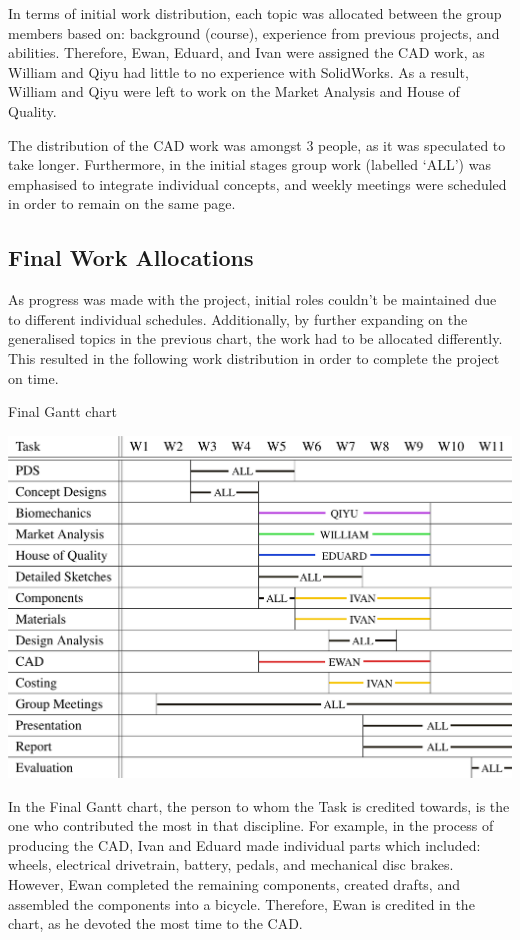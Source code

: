 \documentclass[a4paper,11pt]{article}
\begin{document}
In terms of initial work distribution, each topic was allocated between the group members based on: background (course), experience from previous projects, and abilities. Therefore, Ewan, Eduard, and Ivan were assigned the CAD work, as William and Qiyu had little to no experience with SolidWorks. As a result, William and Qiyu were left to work on the Market Analysis and House of Quality.

The distribution of the CAD work was amongst 3 people, as it was speculated to take longer. Furthermore, in the initial stages group work (labelled `ALL') was emphasised to integrate individual concepts, and weekly meetings were scheduled in order to remain on the same page.

\subsection{Final Work Allocations}

As progress was made with the project, initial roles couldn't be maintained due to different individual schedules. Additionally, by further expanding on the generalised topics in the previous chart, the work had to be allocated differently. This resulted in the following work distribution in order to complete the project on time.

\begin{table}[!ht]
	\centering
	\caption{Final Gantt chart}
	\includegraphics[width=1\textwidth]{gtf}
\end{table}

In the Final Gantt chart, the person to whom the Task is credited towards, is the one who contributed the most in that discipline. For example, in the process of producing the CAD, Ivan and Eduard made individual parts which included: wheels, electrical drivetrain, battery, pedals, and mechanical disc brakes. However, Ewan completed the remaining components, created drafts, and assembled the components into a bicycle. Therefore, Ewan is credited in the chart, as he devoted the most time to the CAD.
\end{document}
